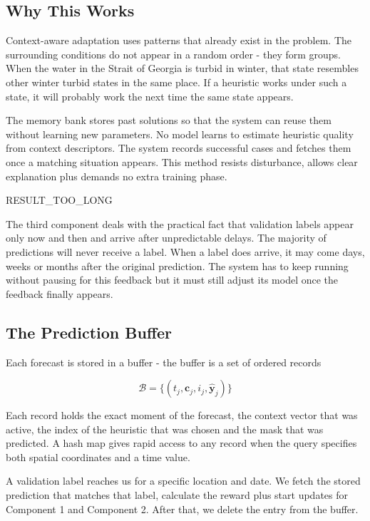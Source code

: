 \documentclass[11pt,a4paper]{article}
\begin{document}
\subsection{Why This Works}

Context-aware adaptation uses patterns that already exist in the problem. The surrounding conditions do not appear in a random order - they form groups. When the water in the Strait of Georgia is turbid in winter, that state resembles other winter turbid states in the same place. If a heuristic works under such a state, it will probably work the next time the same state appears.

The memory bank stores past solutions so that the system can reuse them without learning new parameters. No model learns to estimate heuristic quality from context descriptors. The system records successful cases and fetches them once a matching situation appears. This method resists disturbance, allows clear explanation plus demands no extra training phase.


RESULT_TOO_LONG

The third component deals with the practical fact that validation labels appear only now and then and arrive after unpredictable delays. The majority of predictions will never receive a label. When a label does arrive, it may come days, weeks or months after the original prediction. The system has to keep running without pausing for this feedback but it must still adjust its model once the feedback finally appears.

\subsection{The Prediction Buffer}

Each forecast is stored in a buffer - the buffer is a set of ordered records

\[
\mathcal{B} = \{(t_j, \mathbf{c}_j, i_j, \hat{\mathbf{y}}_j)\}
\]

Each record holds the exact moment of the forecast, the context vector that was active, the index of the heuristic that was chosen and the mask that was predicted. A hash map gives rapid access to any record when the query specifies both spatial coordinates and a time value.

A validation label reaches us for a specific location and date. We fetch the stored prediction that matches that label, calculate the reward plus start updates for Component 1 and Component 2. After that, we delete the entry from the buffer.
\end{document}
